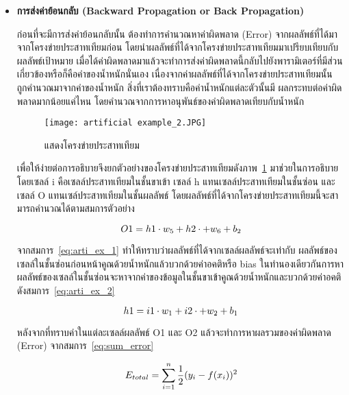 \begin{itemize}

    \item\textbf{การส่งค่าย้อนกลับ (Backward Propagation or Back Propagation)}

    ก่อนที่จะมีการส่งค่าย้อนกลับนั้น ต้องทำการคำนวณหาค่าผิดพลาด (Error) จากผลลัพธ์ที่ได้มาจากโครงข่ายประสาทเทียมก่อน 
    โดยนําผลลัพธ์ที่ได้จากโครงข่ายประสาทเทียมมาเปรียบเทียบกับผลลัพธ์เป้าหมาย 
    เมื่อได้ค่าผิดพลาดมาแล้วจะทำการส่งค่าผิดพลาดนี้กลับไปยังพารามิเตอร์ที่มีส่วนเกี่ยวข้องหรือก็คือค่าของน้ำหนักนั่นเอง
    เนื่องจากค่าผลลัพธ์ที่ได้จากโครงข่ายประสาทเทียมนั้น ถูกคำนวณมาจากค่าของน้ำหนัก สิ่งที่เราต้องทราบคือค่าน้ำหนักแต่ละตัวนั้นมี
    ผลกระทบต่อค่าผิดพลาดมากน้อยแค่ไหน โดยคำนวณจากการหาอนุพันธ์ของค่าผิดพลาดเทียบกับน้ำหนัก

    \begin{figure}[h]
        \centering
        \texttt{[image: artificial example\_2.JPG]}
        \caption{แสดงโครงข่ายประสาทเทียม}
        \label{Fig:Artificial_2}
    \end{figure}

    เพื่อให้ง่ายต่อการอธิบายจึงยกตัวอย่างของโครงข่ายประสาทเทียมดังภาพ~\ref{Fig:Artificial_2} มาช่วยในการอธิบาย
    โดยเซลล์ i คือเซลล์ประสาทเทียมในชั้นขาเข้า เซลล์ h แทนเซลล์ประสาทเทียมในชั้นซ่อน และเซลล์
    O แทนเซล์ประสาทเทียมในชั้นผลลัพธ์ โดยผลลัพธ์ที่ได้จากโครงข่ายประสาทเทียมนี้จะสามารถคํานวณได้ตามสมการตัวอย่าง

    \begin{equation}
        \centering
        O1 = h1 \cdot w_5 + h2 \cdot + w_6 + b_2
        \label{eq:arti_ex_1}
    \end{equation}

    จากสมการ~\ref{eq:arti_ex_1} ทำให้ทราบว่าผลลัพธ์ที่ได้จากเซลล์ผลลัพธ์จะเท่ากับ
    ผลลัพธ์ของเซลล์ในชั้นซ่อนก่อนหน้าคูณด้วยน้ำหนักแล้วบวกด้วยค่าอคติหรือ bias 
    ในทำนองเดียวกันการหาผลลัพธ์ของเซลล์ในชั้นซ่อนจะหาจากค่าของข้อมูลในชั้นขาเข้าคูณด้วยน้ำหนักและบวกด้วยค่าอคติดังสมการ~\ref{eq:arti_ex_2}

    \begin{equation}
        \centering
        h1 = i1 \cdot w_1 + i2 \cdot + w_2 + b_1
        \label{eq:arti_ex_2}
    \end{equation}

    หลังจากที่ทราบค่าในแต่ละเซลล์ผลลัพธ์ O1 และ O2 แล้วจะทำการหาผลรวมของค่าผิดพลาด (Error) จากสมการ~\ref{eq:sum_error}

    \begin{equation}
        \centering
        E_{total} = \sum_{i=1}^{n}\frac{1}{2}(y_{i} - f(x_i))^2
        \label{eq:sum_error}
    \end{equation}


\end{itemize}
